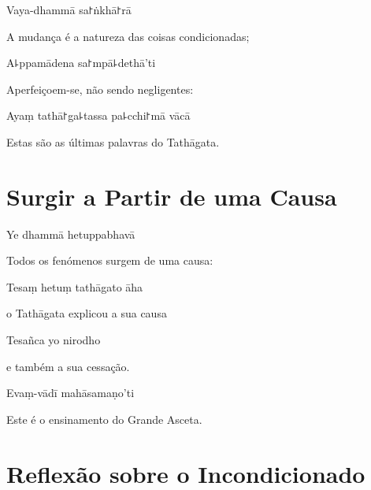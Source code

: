 Vaya-dhammā sa꜓ṅkhā꜓rā

\begin{english}
  A mudança é a natureza das coisas condicionadas;
\end{english}

A꜕ppamādena sa꜓mpā꜕dethā'ti

\begin{english}
  Aperfeiçoem-se, não sendo negligentes:
\end{english}

Ayaṃ tathā꜓ga꜕tassa pa꜕cchi꜓mā vācā

\begin{english}
  Estas são as últimas palavras do Tathāgata.
\end{english}

\chapter{Surgir a Partir de uma Causa}


\begin{leader}
\end{leader}

Ye dhammā hetuppabhavā

\begin{english}
  Todos os fenómenos surgem de uma causa:
\end{english}

Tesaṃ hetuṃ tathāgato āha

\begin{english}
  o Tathāgata explicou a sua causa
\end{english}

Tesañca yo nirodho

\begin{english}
  e também a sua cessação.
\end{english}

Evaṃ-vādī mahāsamaṇo'ti

\begin{english}
  Este é o ensinamento do Grande Asceta.
\end{english}


\chapter[Incondicionado]{Reflexão sobre o Incondicionado}

